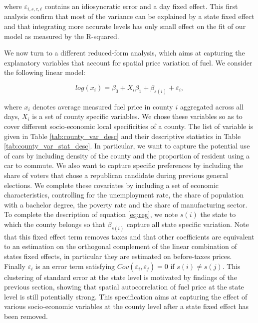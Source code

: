 \documentclass[10pt]{article}
\begin{document}
where $\varepsilon_{i,s,c,t}$ contains an idiosyncratic error and a day fixed effect. This first analysis confirm that most of the variance can be explained by a state fixed effect and that integrating more accurate levels has only small effect on the fit of our model as measured by the R-squared.

We now turn to a different reduced-form analysis, which aims at capturing the explanatory variables that account for spatial price variation of fuel. We consider the following linear model:

\begin{equation}
\label{eq:reg}
log(x_{i}) = \beta_0 + X_{i}\beta_1 + \beta_{s(i)} + \varepsilon_{i},
\end{equation}

where $x_{i}$ denotes average measured fuel price in county $i$ aggregated across all days, $X_{i}$ is a set of county specific variables. We chose these variables so as to cover different socio-economic local specificities of a county. The list of variable is given in Table \ref{tab:county_var_desc} and their descriptive statistics in Table \ref{tab:county_var_stat_desc}. In particular, we want to capture the potential use of cars by including density of the county and the proportion of resident using a car to commute. We also want to capture specific preferences by including the share of voters that chose a republican candidate during previous general elections. We complete these covariates by including a set of economic characteristics, controlling for the unemployment rate, the share of population with a bachelor degree, the poverty rate and the share of manufacturing sector. To complete the description of equation \ref{eq:reg}, we note $s(i)$ the state to which the county belongs so that $\beta_{s(i)}$ capture all state specific variation. Note that this fixed effect term removes taxes and that other coefficients are equivalent to an estimation on the orthogonal complement of the linear combination of states fixed effects, in particular they are estimated on before-taxes prices. Finally $\varepsilon_{i}$ is an error term satisfying $Cov(\varepsilon_{i}, \varepsilon_{j}) = 0$ if $s(i) \neq s(j)$. This clustering of standard error at the state level is motivated by findings of the previous section, showing that spatial autocorrelation of fuel price at the state level is still potentially strong. This specification aims at capturing the effect of various socio-economic variables at the county level after a state fixed effect has been removed.
\end{document}
